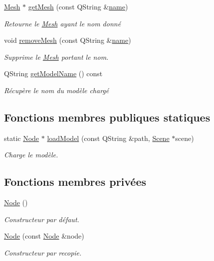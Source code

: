 \begin{DoxyCompactItemize}
\hyperlink{class_mesh}{Mesh} $\ast$ \hyperlink{class_node_a47c225bb649c6d44763661f6e3253c7c}{get\+Mesh} (const Q\+String \&\hyperlink{class_objet_a4a702c189bedcbf1e65da6aec72c8e44}{name})
\begin{DoxyCompactList}\small\item\em Retourne le \hyperlink{class_mesh}{Mesh} ayant le nom donné \end{DoxyCompactList}\item 
void \hyperlink{class_node_ada41b9bdf6e91579ef585e1272f66045}{remove\+Mesh} (const Q\+String \&\hyperlink{class_objet_a4a702c189bedcbf1e65da6aec72c8e44}{name})
\begin{DoxyCompactList}\small\item\em Supprime le \hyperlink{class_mesh}{Mesh} portant le nom. \end{DoxyCompactList}\item 
Q\+String \hyperlink{class_node_adf80c463ba15d60645252ffa171fd209}{get\+Model\+Name} () const 
\begin{DoxyCompactList}\small\item\em Récupère le nom du modèle chargé \end{DoxyCompactList}\end{DoxyCompactItemize}
\subsection*{Fonctions membres publiques statiques}
\begin{DoxyCompactItemize}
\item 
static \hyperlink{class_node}{Node} $\ast$ \hyperlink{class_node_ac2140ddf8f06f8b5620e6743c945c482}{load\+Model} (const Q\+String \&path, \hyperlink{class_scene}{Scene} $\ast$scene)
\begin{DoxyCompactList}\small\item\em Charge le modèle. \end{DoxyCompactList}\end{DoxyCompactItemize}
\subsection*{Fonctions membres privées}
\begin{DoxyCompactItemize}
\item 
\hyperlink{class_node_ad7a34779cad45d997bfd6d3d8043c75f}{Node} ()
\begin{DoxyCompactList}\small\item\em Constructeur par défaut. \end{DoxyCompactList}\item 
\hyperlink{class_node_a4bf5930c1238505203c3dcf6e4573bad}{Node} (const \hyperlink{class_node}{Node} \&node)
\begin{DoxyCompactList}\small\item\em Constructeur par recopie. \end{DoxyCompactList}\end{DoxyCompactItemize}
